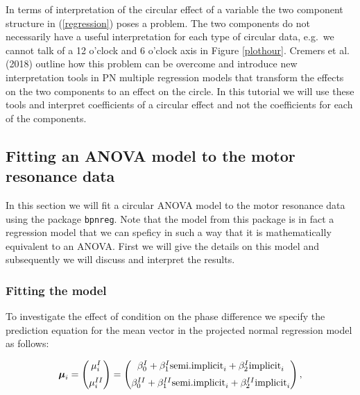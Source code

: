 \documentclass[11pt,]{article}
\begin{document}
In terms of interpretation of the circular effect of a variable the two
component structure in (\ref{regression}) poses a problem. The two
components do not necessarily have a useful interpretation for each type
of circular data, e.g.~we cannot talk of a 12 o'clock and 6 o'clock axis
in Figure \ref{plothour}. Cremers et al. (2018) outline how this problem
can be overcome and introduce new interpretation tools in PN multiple
regression models that transform the effects on the two components to an
effect on the circle. In this tutorial we will use these tools and
interpret coefficients of a circular effect and not the coefficients for
each of the components.

\subsection{Fitting an ANOVA model to the motor resonance data}\label{RegModelMotor}

In this section we will fit a circular ANOVA model to the motor
resonance data using the package \verb|bpnreg|. Note that the model from
this package is in fact a regression model that we can speficy in such a
way that it is mathematically equivalent to an ANOVA. First we will give
the details on this model and subsequently we will discuss and interpret
the results.

\subsubsection{Fitting the model}\label{fitMotor}

To investigate the effect of condition on the phase difference we
specify the prediction equation for the mean vector in the projected
normal regression model as follows:

\begin{equation}\label{regressionmotor}
\boldsymbol{\mu}_{i} = \begin{pmatrix}
  \mu_{i}^{I}  \vspace{0.2cm}  \\
\mu_{i}^{II}
 \end{pmatrix}=\begin{pmatrix}
  \beta_{0}^{I} +  \beta_{1}^{I}\text{semi.implicit}_{i}+  \beta_{2}^{I}\text{implicit}_{i} \vspace{0.2cm}  \\
  \beta_{0}^{II} +  \beta_{1}^{II}\text{semi.implicit}_{i}+  \beta_{2}^{II}\text{implicit}_{i}  
 \end{pmatrix},
\end{equation}
\end{document}
